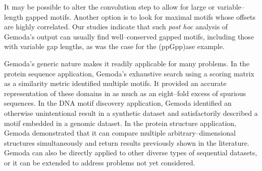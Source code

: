 It may be possible to alter the convolution step to
allow for large or variable--length gapped motifs.
Another option is to look for maximal motifs whose offsets
are highly correlated.  Our studies indicate that such
\textit{post hoc} analysis of Gemoda's output can usually
find well--conserved gapped motifs, including those with
variable gap lengths, as was the case for the (ppGpp)ase
example.

Gemoda's generic nature makes it readily applicable for
many problems.  In the protein sequence application,
Gemoda's exhaustive search using a scoring matrix as a
similarity metric identified multiple motifs.  It provided
an accurate representation of these domains in as much
as an eight--fold excess of spurious sequences.  In the
DNA motif discovery application, Gemoda identified an
otherwise unintentional result in a synthetic dataset
and satisfactorily described a motif embedded in a
genomic dataset.  In the protein structure application,
Gemoda demonstrated that it can compare multiple
arbitrary--dimensional structures simultaneously and
return results previously shown in the literature.
Gemoda can also be directly applied to other diverse types
of sequential datasets, or it can be extended to address
problems not yet considered.
